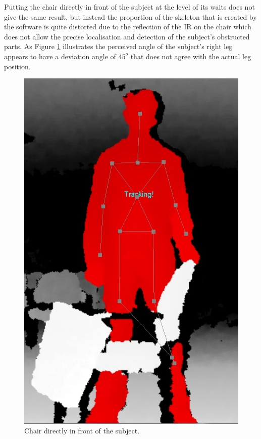 \documentclass[a4paper]{article}
\begin{document}
Putting the chair directly in front of the subject at the level of its waits does not give the same result, but instead the proportion of the skeleton that is created by the software is quite distorted due to the reflection of the IR on the chair which does not allow the precise localisation and detection of the subject's obstructed parts. As Figure \ref{chair} illustrates the perceived angle of the subject's right leg appears to have a deviation angle of $45^o$ that does not agree with the actual leg position.

\begin{figure}[H]
\center
\includegraphics[scale=0.2]{Chair.jpg} 
\caption{Chair directly in front of the subject.}
\label{chair}
\end{figure} 
\end{document}
